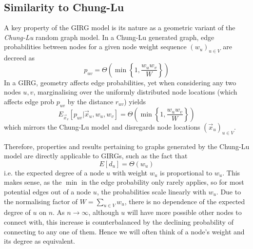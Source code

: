 
\subsection{Similarity to Chung-Lu}
A key property of the GIRG model is its nature as a geometric variant of the \textit{Chung-Lu} random graph model. In a Chung-Lu generated graph, edge probabilities between nodes for a given node weight sequence $(w_u)_{u \in V}$ are decreed as
\begin{equation}
    p_{uv} = \Theta \left (\min \left \{1, \frac{w_u w_v}{W} \right \} \right )
\end{equation}
In a GIRG, geometry affects edge probabilities, yet when considering any two nodes $u,v$, marginalising over the uniformly distributed node locations (which affects edge prob $p_{uv}$ by the distance $r_{uv}$) yields
\begin{equation}
    E_{\vec{x}_v}[p_{uv} | \vec{x}_u, w_u, w_v] = \Theta \left (\min \left \{1, \frac{w_u w_v}{W} \right \} \right )
    \label{eq:GIRG_edge_prob_marginalised}
\end{equation}
which mirrors the Chung-Lu model and disregards node locations $(\vec{x}_u)_{u \in V}$.

Therefore, properties and results pertaining to graphs generated by the Chung-Lu model are directly applicable to GIRGs, such as the fact that
\begin{equation}
    E[d_u] = \Theta(w_u)
\end{equation}
i.e. the expected degree of a node $u$ with weight $w_u$ is proportional to $w_u$. This makes sense, as the $\min$ in the edge probability only rarely applies, so for most potential edges out of a node $u$, the probabilities scale linearly with $w_u$. Due to the normalising factor of $W = \sum_{u \in V} w_u$, there is no dependence of the expected degree of $u$ on $n$. As $n \to \infty$, although $u$ will have more possible other nodes to connect with, this increase is counterbalanced by the declining probability of connecting to any one of them. Hence we will often think of a node's weight and its degree as equivalent.

